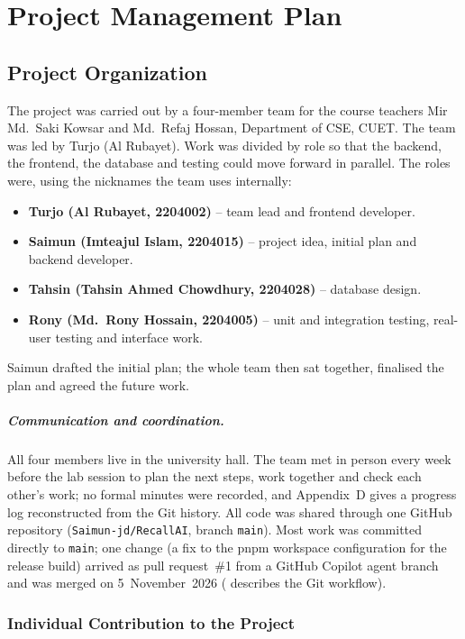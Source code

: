 \chapter{Project Management Plan}\label{ch:pm}

\section{Project Organization}

The project was carried out by a four-member team for the course teachers Mir Md.\ Saki
Kowsar and Md.\ Refaj Hossan, Department of CSE, CUET. The team was led by Turjo (Al
Rubayet). Work was divided by role so that the backend, the frontend, the database and
testing could move forward in parallel. The roles were, using the nicknames the team uses
internally:
\begin{itemize}
  \item \textbf{Turjo (Al Rubayet, 2204002)} -- team lead and frontend developer.
  \item \textbf{Saimun (Imteajul Islam, 2204015)} -- project idea, initial plan and backend
  developer.
  \item \textbf{Tahsin (Tahsin Ahmed Chowdhury, 2204028)} -- database design.
  \item \textbf{Rony (Md.~Rony Hossain, 2204005)} -- unit and integration testing,
  real-user testing and interface work.
\end{itemize}
Saimun drafted the initial plan; the whole team then sat together, finalised the plan and
agreed the future work.

\paragraph{Communication and coordination.}
All four members live in the university hall. The team met in person every week before
the lab session to plan the next steps, work together and check each other's work; no
formal minutes were recorded, and Appendix~D gives a progress log reconstructed from the
Git history. All code was shared through one GitHub repository (\texttt{Saimun-jd/RecallAI},
branch \texttt{main}). Most work was committed directly to \texttt{main}; one change (a fix
to the pnpm workspace configuration for the release build) arrived as pull request~\#1 from
a GitHub Copilot agent branch and was merged on 5~November~2026 ( describes
the Git workflow).

\subsection{Individual Contribution to the Project}

